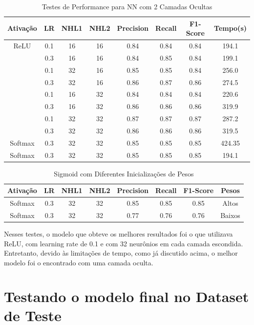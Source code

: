 \documentclass[conference]{IEEEtran}
\begin{document}
\begin{table}[h!]
 \begin{center}
  \caption{Testes de Performance para NN com 2 Camadas Ocultas}
  \label{table:table2}
  \begin{tabular}{ |c|c|c|c|c|c|c|c| }
   \hline
   Ativação & LR & NHL1 & NHL2 & Precision & Recall & F1-Score & Tempo(s)\\
   \hline
   ReLU & 0.1 & 16 & 16 & 0.84 & 0.84 & 0.84 & 194.1 \\
        & 0.3 & 16 & 16 & 0.84 & 0.85 & 0.84 & 199.1 \\
        & 0.1 & 32 & 16 & 0.85 & 0.85 & 0.84 & 256.0 \\
        & 0.3 & 32 & 16 & 0.86 & 0.87 & 0.86 & 274.5 \\
        & 0.1 & 16 & 32 & 0.84 & 0.84 & 0.84 & 220.6 \\
        & 0.3 & 16 & 32 & 0.86 & 0.86 & 0.86 & 319.9 \\
        & 0.1 & 32 & 32 & 0.87 & 0.87 & 0.87 & 287.2 \\
        & 0.3 & 32 & 32 & 0.86 & 0.86 & 0.86 & 319.5 \\
   \hline
   Softmax & 0.3 & 32 & 32 & 0.85 & 0.85 & 0.85 & 424.35 \\
   Softmax & 0.3 & 32 & 32 & 0.85 & 0.85 & 0.85 & 194.1 \\

 \hline
 \end{tabular}
 \end{center}
\end{table}

\begin{table}[h!]
 \begin{center}
  \caption{Sigmoid com Diferentes Inicializações de Pesos}
  \label{table:table3}
  \begin{tabular}{ |c|c|c|c|c|c|c|c| }
   \hline
   Ativação & LR & NHL1 & NHL2 & Precision & Recall & F1-Score & Pesos\\
   \hline
   Softmax & 0.3 & 32 & 32 & 0.85 & 0.85 & 0.85 & Altos \\
   Softmax & 0.3 & 32 & 32 & 0.77 & 0.76 & 0.76 & Baixos \\
   \hline
 \end{tabular}
 \end{center}
\end{table}

	Nesses testes, o modelo que obteve os melhores resultados foi o que utilizava ReLU, com learning rate de 0.1 e com 32 neurônios em cada camada escondida. Entretanto, devido às limitações de tempo, como já discutido acima, o melhor modelo foi o encontrado com uma camada oculta.
	
\section{Testando o modelo final no Dataset de Teste}

	

\printbibliography
\end{document}
